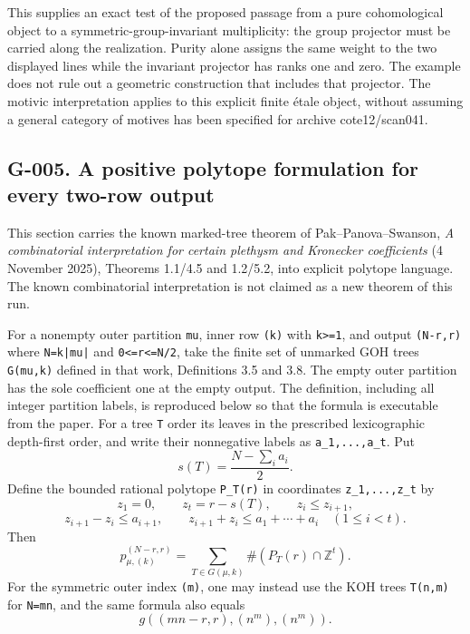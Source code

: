 \documentclass[
  10pt,
]{article}
\begin{document}
This supplies an exact test of the proposed passage from a pure
cohomological object to a symmetric-group-invariant multiplicity: the
group projector must be carried along the realization. Purity alone
assigns the same weight to the two displayed lines while the invariant
projector has ranks one and zero. The example does not rule out a
geometric construction that includes that projector. The motivic
interpretation applies to this explicit finite étale object, without
assuming a general category of motives has been specified for archive
cote12/scan041.

\subsection{G-005. A positive polytope formulation for every two-row
output}\label{g-005.-a-positive-polytope-formulation-for-every-two-row-output}

This section carries the known marked-tree theorem of
Pak--Panova--Swanson, \emph{A combinatorial interpretation for certain
plethysm and Kronecker coefficients} (4 November 2025), Theorems 1.1/4.5
and 1.2/5.2, into explicit polytope language. The known combinatorial
interpretation is not claimed as a new theorem of this run.

For a nonempty outer partition \texttt{\small mu}, inner row
\texttt{\small (\allowbreak{}k)\allowbreak{}} with
\texttt{\small k>=\allowbreak{}1}, and output
\texttt{\small (\allowbreak{}N-\allowbreak{}r,\allowbreak{}r)\allowbreak{}}
where \texttt{\small N=\allowbreak{}k|mu|} and
\texttt{\small 0<=\allowbreak{}r<=\allowbreak{}N/\allowbreak{}2}, take
the finite set of unmarked GOH trees
\texttt{\small G(\allowbreak{}mu,\allowbreak{}k)\allowbreak{}} defined
in that work, Definitions 3.5 and 3.8. The empty outer partition has the
sole coefficient one at the empty output. The definition, including all
integer partition labels, is reproduced below so that the formula is
executable from the paper. For a tree \texttt{\small T} order its leaves
in the prescribed lexicographic depth-first order, and write their
nonnegative labels as
\texttt{\small a\_\allowbreak{}1,\allowbreak{}...,\allowbreak{}a\_\allowbreak{}t}.
Put \[
s(T)=\frac{N-\sum_i a_i}{2}.
\] Define the bounded rational polytope
\texttt{\small P\_\allowbreak{}T(\allowbreak{}r)\allowbreak{}} in
coordinates
\texttt{\small z\_\allowbreak{}1,\allowbreak{}...,\allowbreak{}z\_\allowbreak{}t}
by \[
z_1=0,\qquad z_t=r-s(T),\qquad z_i\le z_{i+1},
\tag{G5.1}
\] \[
z_{i+1}-z_i\le a_{i+1},\qquad
z_{i+1}+z_i\le a_1+\cdots+a_i
\quad(1\le i<t).
\tag{G5.2}
\] Then \[
p_{\mu,(k)}^{(N-r,r)}
=\sum_{T\in G(\mu,k)}\#(P_T(r)\cap\mathbb Z^t).
\tag{G5.3}
\] For the symmetric outer index
\texttt{\small (\allowbreak{}m)\allowbreak{}}, one may instead use the
KOH trees \texttt{\small T(\allowbreak{}n,\allowbreak{}m)\allowbreak{}}
for \texttt{\small N=\allowbreak{}mn}, and the same formula also equals
\[
g((mn-r,r),(n^m),(n^m)).
\tag{G5.4}
\]
\end{document}
